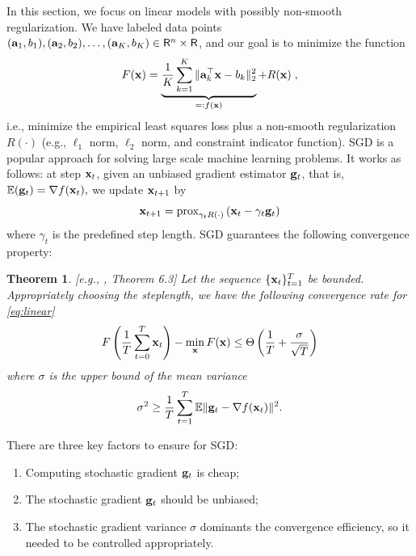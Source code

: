 \documentclass{article}
\newcommand{\R}{\mathsf{R}}
\def\a{{\bf a}}
\def\g{{\bf g}}
\def\x{{\bf x}}
\def\E{\mathbb{E}}
\newtheorem{theorem}{Theorem}
\begin{document}
\vspace{-0.5em}
In this section, we focus on linear models with possibly non-smooth regularization. We have labeled data points $(\a_1, b_1), (\a_2, b_2), \ldots, (\a_K, b_K) \in \R^n \times \R$, and our goal is to minimize the function
\vspace{-0.5em}
\begin{align}
F(\x) = \underbrace{\frac{1}{K} \sum_{k = 1}^K \| \a_k^\top \x - b_k \|_2^2}_{=: f(\x)} + R(\x) \; ,
\label{eq:linear}
\end{align}
i.e., minimize the empirical least squares loss plus a non-smooth regularization $R(\cdot)$ (e.g., $\ell_1$ norm, $\ell_2$ norm, and constraint indicator function). SGD is a popular approach for solving large scale machine learning problems. It works as follows: at step $\x_t$, given an unbiased gradient estimator $\g_t$, that is, 
$\E(\g_t) = \nabla f(\x_t),$
we update $\x_{t+1}$ by
\[
\x_{t+1} = \text{prox}_{\gamma_t R(\cdot)}\left( \x_t - \gamma_t \g_t\right)
\]
where $\gamma_t$ is the predefined step length. SGD guarantees the following convergence property:
\begin{theorem}\label{thm:sgd-conv}[e.g., \cite{2014arXiv1405.4980B}, Theorem 6.3]
Let the sequence $\{\x_t\}_{t=1}^T$ be bounded. Appropriately choosing the steplength,
we have the following convergence rate for \eqref{eq:linear}
% 
\begin{equation}
F\left(\frac{1}{T} \sum_{t = 0}^T \x_t\right) - \min_{\x}F(\x) \leq \Theta\left({1\over T} + {\sigma \over \sqrt{T}}\right) 
\label{eq:sgd-conv}
\end{equation}
where $\sigma$ is the upper bound of the mean variance 
\[
\sigma^2 \geq {1\over T}\sum_{t=1}^T \E\|\g_t - \nabla f(\x_t)\|^2. 
\]
\end{theorem} 
\vspace{-2em}
There are three key factors to ensure for SGD:
\begin{enumerate}
\vspace{-0.75em}
\item Computing stochastic gradient $\g_t$ is cheap;
\vspace{-0.75em}
\item The stochastic gradient $\g_t$ should be unbiased;
\vspace{-0.75em}
\item The stochastic gradient variance $\sigma$ dominants the convergence efficiency, so it needed to be controlled appropriately.
\end{enumerate}
\end{document}
